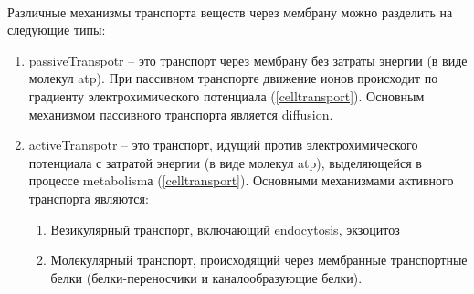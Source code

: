 \paragraph*{}Различные механизмы транспорта веществ через мембрану можно разделить на следующие типы:

\begin{enumerate}

\item \gls{passiveTranspotr} -- это транспорт через мембрану без затраты энергии (в виде молекул \gls{atp}). При пассивном транспорте движение ионов происходит по градиенту электрохимического потенциала (\ris \ref{celltransport}). Основным механизмом пассивного транспорта является \gls{diffusion}.
	
\item \gls{activeTranspotr} -- это транспорт, идущий против электрохимического потенциала с затратой энергии (в виде молекул \gls{atp}), выделяющейся в процессе \gls{metabolism}а (\ris \ref{celltransport}). Основными механизмами активного транспорта являются:
	
	\begin{enumerate}
	
		\item Везикулярный транспорт, включающий \Gls{endocytosis}, экзоцитоз
		\item Молекулярный транспорт, происходящий через мембранные транспортные белки (белки-переносчики и каналообразующие белки).
	
	\end{enumerate}

\end{enumerate}

